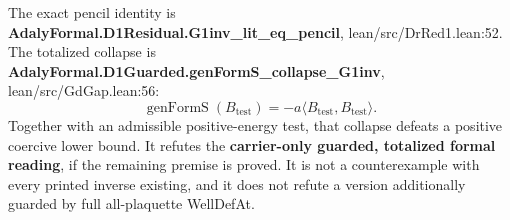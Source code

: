 The exact pencil identity is \textbf{AdalyFormal.D1Residual.G1inv\_lit\_eq\_pencil}, lean/src/DrRed1.lean:52. The totalized collapse is \textbf{AdalyFormal.D1Guarded.genFormS\_collapse\_G1inv}, lean/src/GdGap.lean:56:
\[
\operatorname{genFormS}(B_{\mathrm{test}})=-a\langle B_{\mathrm{test}},B_{\mathrm{test}}\rangle.
\]
Together with an admissible positive-energy test, that collapse defeats a positive coercive lower bound. It refutes the \textbf{carrier-only guarded, totalized formal reading}, if the remaining premise is proved. It is not a counterexample with every printed inverse existing, and it does not refute a version additionally guarded by full all-plaquette WellDefAt.

